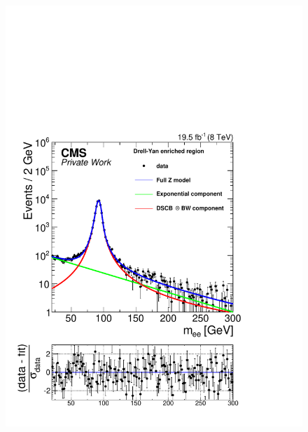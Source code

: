\begin{figure}[htbp]
\begin{minipage}[t]{0.49\textwidth}
  \includegraphics[width=\textwidth]{plots/results/fit/expoFitEE_Log_Forward.pdf}
\end{minipage}
\begin{minipage}[t]{0.49\textwidth}

\end{minipage}
\end{figure}
